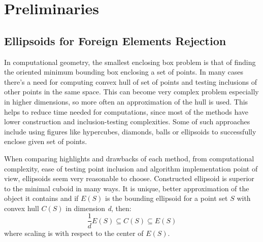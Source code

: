\documentclass{llncs}
\begin{document}



\section{Preliminaries}
  \label{sec:preliminaries}



\subsection{Ellipsoids for Foreign Elements Rejection}


In computational geometry, the smallest enclosing box problem is that of finding the oriented minimum bounding box enclosing a set of points. In many cases there's a need for computing convex hull of set of points and testing inclusions of other points in the same space. This can become very complex problem especially in higher dimensions, so more often an approximation of the hull is used. This helps to reduce time needed for computations, since most of the methods have lower construction and inclusion-testing complexities. Some of such approaches include using figures like hypercubes, diamonds, balls or ellipsoids to successfully enclose given set of points.

When comparing highlights and drawbacks of each method, from computational complexity, ease of testing point inclusion and algorithm implementation point of view, ellipsoids seem very reasonable to choose. Constructed ellipsoid is superior to the minimal cuboid in many ways. It is unique, better approximation of the object it contains and if $E(S)$ is the bounding ellipsoid for a point set $S$ with convex hull $C(S)$ in dimension \textit{d}, then:
\[ \frac{1}{d}E(S) \subseteq C(S) \subseteq E(S) \]
where scaling is with respect to the center of $E(S)$.
\end{document}
